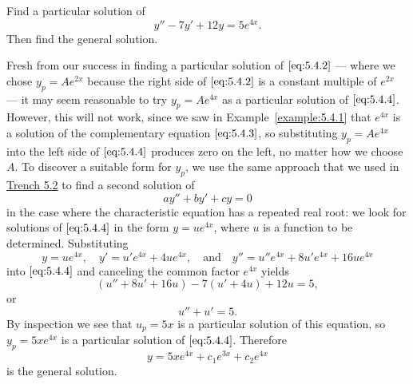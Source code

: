 \documentclass{ximera}
\begin{document}
\begin{example}\label{example:5.4.2}
Find a particular solution of
\begin{equation} \label{eq:5.4.4}
y''-7y'+12y=5e^{4x}.
\end{equation}
Then find the general solution.
 
\begin{explanation}
Fresh from our success in finding a particular solution of
$\eqref{eq:5.4.2}$ --- where we chose $y_p=Ae^{2x}$ because the right side
of
$\eqref{eq:5.4.2}$ is a constant multiple of $e^{2x}$ --- it may seem reasonable to try $y_p=Ae^{4x}$ as a particular solution of
$\eqref{eq:5.4.4}$. However, this will not work, since we saw in
Example~\ref{example:5.4.1} that $e^{4x}$ is a solution of the
complementary equation $\eqref{eq:5.4.3}$, so substituting $y_p=Ae^{4x}$
into the left side of $\eqref{eq:5.4.4}$ produces zero on the left, no
matter how we choose $A$. To discover a suitable form for $y_p$,
we use the same approach that we used in \href{https://xerxes.ximera.org/differentialequations/main/constantCoefficientHomogeneousEquations/constantCoefficientHomogeneousEquations}{Trench 5.2} to find a
second solution of
$$
ay''+by'+cy=0
$$
in the case where the characteristic equation has a repeated real
root: we look for solutions of $\eqref{eq:5.4.4}$ in the form $y=ue^{4x}$,
where $u$ is a function to be determined. Substituting
\begin{equation} \label{eq:5.4.5}
y=ue^{4x},\quad
y'=u'e^{4x}+4ue^{4x},\quad\mbox{and}\quad
y''=u''e^{4x}+8u'e^{4x}+16ue^{4x}
\end{equation}
into $\eqref{eq:5.4.4}$ and canceling the common factor $e^{4x}$ yields
$$
(u''+8u'+16u)-7(u'+4u)+12u=5,
$$
or
$$
u''+u'=5.
$$
By inspection we  see that $u_p=5x$ is a particular solution of
this equation, so $y_p=5xe^{4x}$ is a particular solution of
$\eqref{eq:5.4.4}$. Therefore
$$
y=5xe^{4x}+c_1e^{3x}+c_2e^{4x}
$$
is the general solution.
\end{explanation}
\end{example}
 
\end{document}
